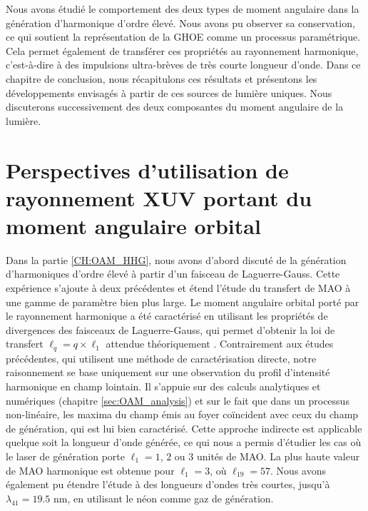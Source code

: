 
\renewcommand{\thesection}{\Roman{section}}
\setcounter{section}{0}
\renewcommand*{\theHsection}{CL.\the\value{section}}
\renewcommand{\thefigure}{\Roman{section}.\arabic{figure}}
\setcounter{figure}{0}



Nous avons étudié le comportement des deux types de moment angulaire dans la génération d'harmonique d'ordre élevé. Nous avons pu observer sa conservation, ce qui soutient la représentation de la GHOE comme un processus paramétrique. Cela permet également de transférer ces propriétés au rayonnement harmonique, c'est-à-dire à des impulsions ultra-brèves de très courte longueur d'onde. Dans ce chapitre de conclusion, nous récapitulons ces résultats et présentons les développements envisagés à partir de ces sources de lumière uniques. Nous discuterons successivement des deux composantes du moment angulaire de la lumière.

\section{Perspectives d'utilisation de rayonnement XUV portant du moment angulaire orbital}
Dans la partie \ref{CH:OAM_HHG}, nous avons d'abord discuté de la génération d'harmoniques d'ordre élevé à partir d'un faisceau de Laguerre-Gauss. Cette expérience s'ajoute à deux précédentes  et étend l'étude du transfert de MAO à une gamme de paramètre bien plus large. Le moment angulaire orbital porté par le rayonnement harmonique a été caractérisé en utilisant les propriétés de divergences des faisceaux de Laguerre-Gauss, qui permet d'obtenir la loi de transfert $\ell_q=q\times\ell_1$ attendue théoriquement . Contrairement aux études précédentes, qui utilisent une méthode de caractérisation directe, notre raisonnement se base uniquement sur une observation du profil d'intensité harmonique en champ lointain. Il s'appuie sur des calculs analytiques et numériques (chapitre \ref{sec:OAM_analysis}) et sur le fait que dans un processus non-linéaire, les maxima du champ émis au foyer coïncident avec ceux du champ de génération, qui est lui bien caractérisé. Cette approche indirecte est applicable quelque soit la longueur d'onde générée, ce qui nous a permis d'étudier les cas où le laser de génération porte $\ell_1=1$, $2$ ou $3$ unités de MAO. La plus haute valeur de MAO harmonique est obtenue pour $\ell_1=3$, où $\ell_{19} = 57$. Nous avons également pu étendre l'étude à des longueurs d'ondes très courtes, jusqu'à $\lambda_{41} = 19.5$ nm, en utilisant le néon comme gaz de génération.

